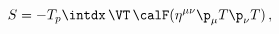 \begin{equation}
 S=-T_p \intdx\, \VT\, \calF
	(\eta^{\mu\nu} \p_\mu T \p_\nu T)\,,\label{action}
\end{equation}

